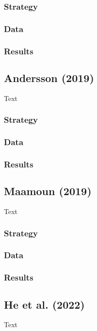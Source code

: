 \documentclass[12pt,a4paper,draft]{article}
\begin{document}
\subsubsection*{Strategy}
\subsubsection*{Data}
\subsubsection*{Results}



\subsection{Andersson (2019)}
Text

\subsubsection*{Strategy}
\subsubsection*{Data}
\subsubsection*{Results}



\subsection{Maamoun (2019)}
Text

\subsubsection*{Strategy}
\subsubsection*{Data}
\subsubsection*{Results}



\subsection{He et al. (2022)}
Text
\end{document}
